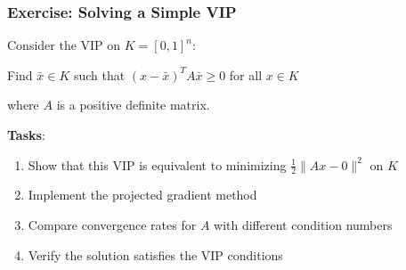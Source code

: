 \documentclass[aspectratio=169,10pt]{beamer}
\begin{document}
\begin{frame}
\frametitle{Exercise: Solving a Simple VIP}

\vspace{0.2cm}

\begin{example}
Consider the VIP on $K = [0, 1]^n$:

Find $\bar{x} \in K$ such that $(x - \bar{x})^T A\bar{x} \geq 0$ for all $x \in K$

where $A$ is a positive definite matrix.

\vspace{0.2cm}

\textbf{Tasks}:
\begin{enumerate}
    \item Show that this VIP is equivalent to minimizing $\frac{1}{2}\|Ax - 0\|^2$ on $K$

    \item Implement the projected gradient method

    \item Compare convergence rates for $A$ with different condition numbers

    \item Verify the solution satisfies the VIP conditions
\end{enumerate}
\end{example}

\end{frame}
\end{document}
